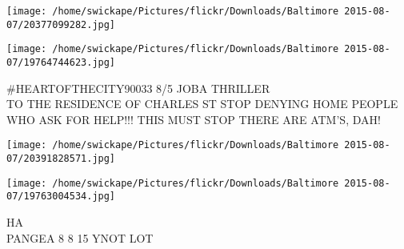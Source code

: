 \documentclass[10pt,letterpaper]{article}
\begin{document}
\texttt{[image: /home/swickape/Pictures/flickr/Downloads/Baltimore 2015-08-07/20377099282.jpg]}

\vspace{0.25in}
\texttt{[image: /home/swickape/Pictures/flickr/Downloads/Baltimore 2015-08-07/19764744623.jpg]}

\#HEARTOFTHECITY90033 8/5 JOBA THRILLER\\
TO THE RESIDENCE OF CHARLES ST STOP DENYING HOME PEOPLE WHO ASK FOR HELP!!!  THIS MUST STOP THERE ARE ATM'S, DAH!\\
\pagebreak

\texttt{[image: /home/swickape/Pictures/flickr/Downloads/Baltimore 2015-08-07/20391828571.jpg]}

\vspace{0.25in}
\texttt{[image: /home/swickape/Pictures/flickr/Downloads/Baltimore 2015-08-07/19763004534.jpg]}

HA\\
PANGEA 8 8 15 YNOT LOT\\
\pagebreak
\end{document}
